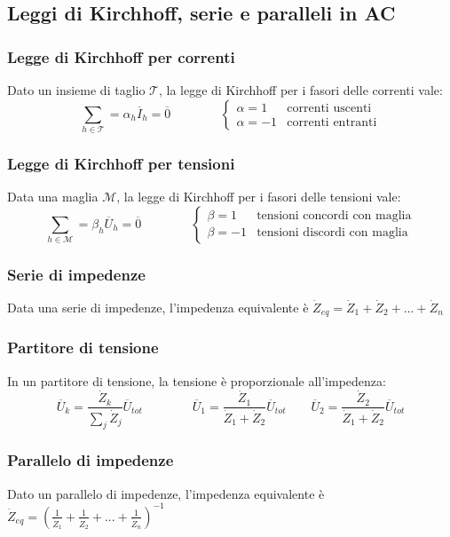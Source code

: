 \documentclass[a4paper]{article}
\begin{document}
\newpage

\subsection{Leggi di Kirchhoff, serie e paralleli in AC}
\subsubsection*{Legge di Kirchhoff per correnti}
Dato un insieme di taglio \(\mathcal{T}\), la legge di Kirchhoff per i fasori delle correnti  vale:
\[\sum_{h \in \mathcal{T}} = \alpha_h \overline{I}_h = \overline{0} \qquad \qquad \begin{cases}\alpha = 1 &\text{correnti uscenti} \\ \alpha = -1 &\text{correnti entranti}\end{cases}\]

\subsubsection*{Legge di Kirchhoff per tensioni}
Data una maglia \(\mathcal{M}\), la legge di Kirchhoff per i fasori delle tensioni vale:
\[\sum_{h \in \mathcal{M}} = \beta_h \overline{U}_h = \overline{0} \qquad \qquad \begin{cases}\beta = 1 &\text{tensioni concordi con maglia} \\ \beta = -1 &\text{tensioni discordi con maglia}\end{cases}\]

\subsubsection*{Serie di impedenze}
Data una serie di impedenze, l'impedenza equivalente è \(\dot{Z}_{eq} = \dot{Z}_1 + \dot{Z}_2 + ... + \dot{Z}_n\)

\subsubsection*{Partitore di tensione}
In un partitore di tensione, la tensione è proporzionale all'impedenza:
\[\overline{U}_k = \frac{\dot{Z}_k}{\sum_j \dot{Z}_j} \overline{U}_{tot} \qquad\qquad \overline{U}_1 = \frac{\dot{Z}_1}{\dot{Z}_1 + \dot{Z}_2} \overline{U}_{tot} \qquad \overline{U}_2 = \frac{\dot{Z}_2}{\dot{Z}_1 + \dot{Z}_2} \overline{U}_{tot}\]

\subsubsection*{Parallelo di impedenze}
Dato un parallelo di impedenze, l'impedenza equivalente è \(\dot{Z}_{eq} = \left(\frac{1}{\dot{Z}_1} + \frac{1}{\dot{Z}_2} + ... + \frac{1}{\dot{Z}_n}\right)^{-1}\)
\end{document}
